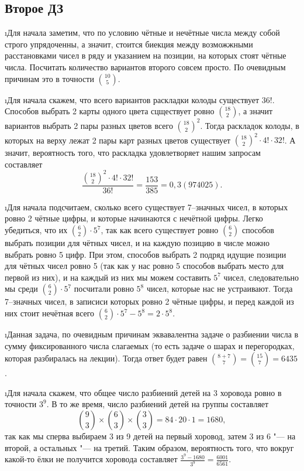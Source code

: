 \subsection{Второе ДЗ}

\i Для начала заметим, что по условию чётные и нечётные числа между собой строго упрядоченны, а значит, стоится биекция между возможжными расстановками чисел в ряду и указанием на позиции, на которых стоят чётные числа. Посчитать количество вариантов второго совсем просто. По очевидным причинам это в точности $\binom{10}{5}$.

\i Для начала скажем, что всего вариантов раскладки колоды существует $36!$. Способов выбрать 2 карты одного цвета сцществует ровно $\binom{18}{2}$, а значит вариантов выбрать 2 пары разных цветов всего $\binom{18}{2}^2$. Тогда раскладок колоды, в которых на верху лежат 2 пары карт разных цветов существует $\binom{18}{2}^2 \cdot 4! \cdot 32!$. А значит, вероятность того, что раскладка удовлетворяет нашим запросам составляет
$$\frac{\binom{18}{2}^2 \cdot 4! \cdot 32!}{36!} = \frac{153}{385} = 0{,}3(974025).$$

\i Для начала подсчитаем, сколько всего существует 7--значных чисел, в которых ровно 2 чётные цифры, и которые начинаются с нечётной цифры. Легко убедиться, что их $\binom{6}{2} \cdot 5^7$, так как всего существует ровно $\binom{6}{2}$ способов выбрать позиции для чётных чисел, и на каждую позицию в числе можно выбрать ровно 5 цифр. При этом, способов выбрать 2 подряд идущие позиции для чётных чисел ровно 5 (так как у нас ровно 5 способов выбрать место для первой из них), и на каждый из них мы можем составить $5^7$ чисел, следовательно мы среди $\binom{6}{2} \cdot 5^7$ посчитали ровно $5^8$ чисел, которые нас не устраивают. Тогда 7--значных чисел, в записиси которых ровно 2 чётные цифры, и перед каждой из них стоит нечётная всего $\binom{6}{2} \cdot 5^7 - 5^8 = 2 \cdot 5^8.$

\i Данная задача, по очевидным причинам эквавалентна задаче о разбиении числа в сумму фиксированного числа слагаемых (то есть задаче о шарах и перегородках, которая разбиралась на лекции). Тогда ответ будет равен $\binom{8+7}{7} = \binom{15}{7} = 6435$.

\i Для начала скажем, что общее число разбиений детей на 3 хоровода ровно в точности $3^9$. В то же время, число разбиений детей на группы составляет 
$$\binom{9}{3} \times \binom{6}{3} \times \binom{3}{3} = 84 \cdot 20 \cdot 1 = 1680,$$
так как мы сперва выбираем 3 из 9 детей на первый хоровод, затем 3 из 6 "--- на второй, а остальных "--- на третий. Таким образом, вероятность того, что вокруг какой-то ёлки не получится хоровода составляет $\frac{3^9 - 1680}{3^9} = \frac{6001}{6561}.$

